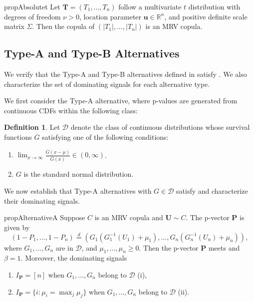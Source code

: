 \documentclass[12pt]{article}
\theoremstyle{plain}
\theoremstyle{plain}
\theoremstyle{definition}
\newtheorem{defn}{Definition}[section]
\begin{document}
\begin{restatable}{prop}{Absolutet}
\label{prop:absolute-t-mrv-copula}
Let $\mathbf{T}=(T_1,\ldots,T_n)$ follow a multivariate
$t$ distribution with degrees of freedom $\nu>0$, location parameter
$\mathbf u\in\mathbb R^n$, and positive definite scale matrix $\Sigma$.
Then the copula of
$(|T_1|,\ldots,|T_n|)$
is an MRV copula.
\end{restatable}



\subsection{Type-A and Type-B Alternatives}
\label{sec:p-alternative}
We verify that the Type-A and Type-B alternatives defined in  satisfy . We also characterize the set of dominating signals for each alternative type.

We first consider the Type-A alternative, where p-values are generated from continuous CDFs within the following class:
\begin{defn}
\label{def:certain-distributions}
Let $\mathscr{D}$ denote the class of continuous distributions whose survival functions $\overline{G}$ satisfying one of the following conditions:
\begin{enumerate}[label=(\roman*)]
\item $\lim_{x\to\infty}\frac{\overline{G}(x-\mu)}{\overline{G}(x)}\in(0,\infty)$.
\item $G$ is the standard normal distribution.
\end{enumerate}
\end{defn}
We now establish that Type-A alternatives with $G \in \mathscr{D}$ satisfy  and characterize their dominating signals.




\begin{restatable}{prop}{AlternativeA}
\label{prop:alternative-a}
Suppose $C$ is an MRV copula and $\mathbf{U}\sim C$. The p-vector $\mathbf{P}$ is given by
\[
(1-P_1,\dots,1-P_n) \overset{d}{=}(G_1(G_1^{-1}(U_1)+\mu_1),\dots, G_n(G_n^{-1}(U_n)+\mu_n)),
\]
where $G_1,\dots,G_n$ are in $\mathscr{D}$, and $\mu_1,\dots,\mu_n\ge0$. Then the p-vector $\mathbf{P}$ meets  and $\beta=1$. Moreover, the dominating signals 
\begin{enumerate}[label=(\roman*)]
\item $I_{\mathbf{P}}=[n]$ when $G_1,\dots,G_n$ belong to $\mathscr{D}$ (i),
\item $I_{\mathbf{P}}=\{i:\mu_i=\max_j{\mu_j}\}$  when $G_1,\dots,G_n$ belong to $\mathscr{D}$ (ii).
\end{enumerate}
\end{restatable}
\end{document}
